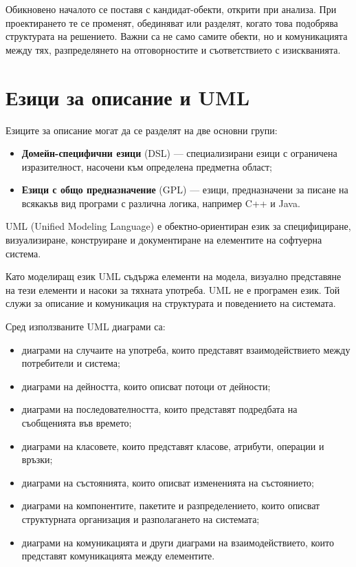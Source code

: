 Обикновено началото се поставя с кандидат-обекти, открити при анализа. При проектирането те се променят, обединяват или разделят, когато това подобрява структурата на решението. Важни са не само самите обекти, но и комуникацията между тях, разпределянето на отговорностите и съответствието с изискванията.

\section{Езици за описание и UML}\label{s:26.7}

Езиците за описание могат да се разделят на две основни групи:

\begin{itemize}
    \item \textbf{Домейн-специфични езици} (DSL) --- специализирани езици с ограничена изразителност, насочени към определена предметна област;
    \item \textbf{Езици с общо предназначение} (GPL) --- езици, предназначени за писане на всякакъв вид програми с различна логика, например C++ и Java.
\end{itemize}

\begin{defn}[UML]
UML (Unified Modeling Language) е обектно-ориентиран език за специфициране, визуализиране, конструиране и документиране на елементите на софтуерна система.
\end{defn}

Като моделиращ език UML съдържа елементи на модела, визуално представяне на тези елементи и насоки за тяхната употреба. UML не е програмен език. Той служи за описание и комуникация на структурата и поведението на системата.

Сред използваните UML диаграми са:

\begin{itemize}
    \item диаграми на случаите на употреба, които представят взаимодействието между потребители и система;
    \item диаграми на дейността, които описват потоци от дейности;
    \item диаграми на последователността, които представят подредбата на съобщенията във времето;
    \item диаграми на класовете, които представят класове, атрибути, операции и връзки;
    \item диаграми на състоянията, които описват измененията на състоянието;
    \item диаграми на компонентите, пакетите и разпределението, които описват структурната организация и разполагането на системата;
    \item диаграми на комуникацията и други диаграми на взаимодействието, които представят комуникацията между елементите.
\end{itemize}

